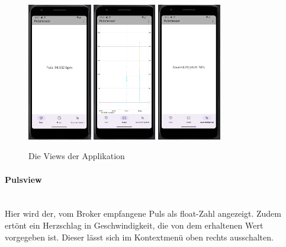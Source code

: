 \documentclass[12pt,oneside]{article}
\begin{document}
  	  	\begin{figure}[tph!]
  	  		\begin{center}
  	  			\includegraphics[height=6cm]{pulseview}
  	  			\includegraphics[height=6cm]{graph}
  	  			\includegraphics[height=6cm]{o2}
  	  			\caption{Die Views der Applikation}
  	  			\label{fig:pulseview}
  	  		\end{center}
  	  	\end{figure}
    	\paragraph{Pulsview}~\\
  	  	Hier wird der, vom Broker empfangene Puls als float-Zahl angezeigt. Zudem ertönt ein Herzschlag in Geschwindigkeit, die von dem erhaltenen Wert vorgegeben ist. Dieser lässt sich im Kontextmenü oben rechts ausschalten.
  	  
\end{document}
